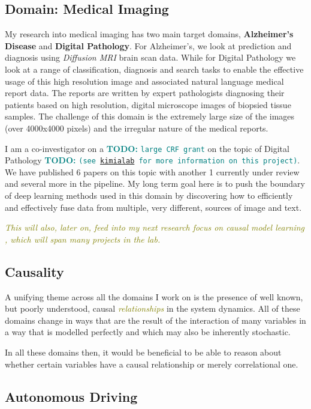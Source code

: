 \documentclass{article}
\newcommand*{\bla}[1]{\textit{\textcolor{olive}{#1}}}
\newcommand{\todo}[1]{\textcolor{teal}{\textbf{TODO: } \texttt{#1}}}
\begin{document}
\subsection{Domain: Medical Imaging}
My research into medical imaging has two main target domains, \textbf{Alzheimer's Disease} and \textbf{Digital Pathology}. For Alzheimer's, we look at prediction and diagnosis using \textit{Diffusion MRI} brain scan data. While for Digital Pathology we look at a range of classification, diagnosis and search tasks to enable the effective usage of this high resolution image and associated 
natural language medical report data. The reports are written by expert pathologists diagnosing their patients based on high resolution, digital microscope images of biopsied tissue samples. The challenge of this domain is the extremely large size of the images (over 4000x4000 pixels) and the irregular nature of the medical reports. 

I am a co-investigator on a \todo{large CRF grant} on the topic of Digital Pathology \todo{(see \url{kimialab} for more information on this project)}. We have published 6 papers on this topic with another 1 currently under review and several more in the pipeline.
My long term goal here is to push the boundary of deep learning methods used in this domain by discovering how to efficiently and effectively fuse data from multiple, very different, sources of image
and text. 

\bla{This will also, later on, feed into my next research focus on causal model learning , which will span many projects in the lab.}

\subsection{Causality}

A unifying theme across all the domains I work on is the presence of well known, but poorly understood, causal \bla{relationships} in the system dynamics. All of these domains change in ways that are the result of the interaction of many variables in a way that is modelled perfectly and which may also be inherently stochastic.

In all these domains then, it would be beneficial to be able to reason about whether certain variables have a causal relationship or merely correlational one.

\subsection{Autonomous Driving}
\end{document}
